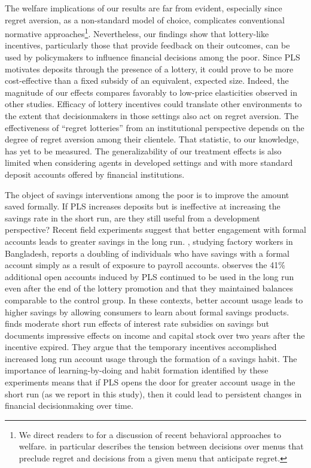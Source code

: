 \documentclass[11pt]{article}
\begin{document}
	The welfare implications of our results are far from evident, especially since regret aversion, as a non-standard model of choice, complicates conventional normative approaches\footnote{We direct readers to \textcite{bernheim_behavioral_2009} for a discussion of recent behavioral approaches to welfare. \textcite{sarver_anticipating_2008} in particular describes the tension between decisions over menus that preclude regret and decisions from a given menu that anticipate regret.}. Nevertheless, our findings show that lottery-like incentives, particularly those that provide feedback on their outcomes, can be used by policymakers to influence financial decisions among the poor. Since PLS motivates deposits through the presence of a lottery, it could prove to be more cost-effective than a fixed subsidy of an equivalent, expected size. Indeed, the magnitude of our effects compares favorably to low-price elasticities observed in other studies. Efficacy of lottery incentives could translate other environments to the extent that decisionmakers in those settings also act on regret aversion. The effectiveness of ``regret lotteries'' from an institutional perspective depends on the degree of regret aversion among their clientele. That statistic, to our knowledge, has yet to be measured. The generalizability of our treatment effects is also limited when considering agents in developed settings and with more standard deposit accounts offered by financial institutions.

	The object of savings interventions among the poor is to improve the amount saved formally. If PLS increases deposits but is ineffective at increasing the savings rate in the short run, are they still useful from a development perspective? Recent field experiments suggest that better engagement with formal accounts leads to greater savings in the long run. \textcite{breza_learning_2020}, studying factory workers in Bangladesh, reports a doubling of individuals who have savings with a formal account simply as a result of exposure to payroll accounts. \textcite{gertler_long-term_2017} observes the 41\% additional open accounts induced by PLS continued to be used in the long run even after the end of the lottery promotion and that they maintained balances comparable to the control group.  In these contexts, better account usage leads to higher savings by allowing consumers to learn about formal savings products. \textcite{schaner_persistent_2018} finds moderate short run effects of interest rate subsidies on savings but documents impressive effects on income and capital stock over two years after the incentive expired. They argue that the temporary incentives accomplished increased long run account usage through the formation of a savings habit. The importance of learning-by-doing and habit formation identified by these experiments means that if PLS opens the door for greater account usage in the short run (as we report in this study), then it could lead to persistent changes in financial decisionmaking over time.
\end{document}
